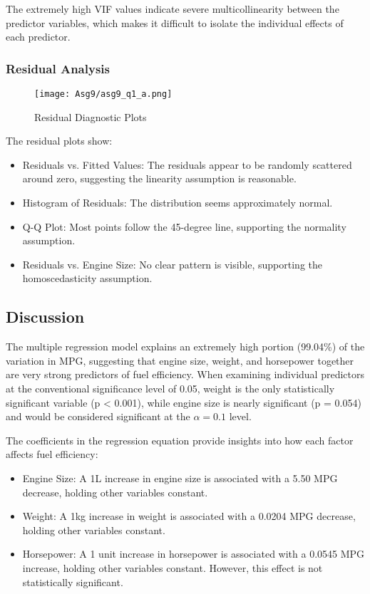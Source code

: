 \documentclass[12pt]{article}
\begin{document}
The extremely high VIF values indicate severe multicollinearity between the predictor variables, which makes it difficult to isolate the individual effects of each predictor.

\subsubsection{Residual Analysis}
\begin{figure}[H]
    \centering
    \texttt{[image: Asg9/asg9\_q1\_a.png]}
    \caption{Residual Diagnostic Plots}
    \label{fig:enter-label}
\end{figure}
The residual plots show:
\begin{itemize}
    \item Residuals vs. Fitted Values: The residuals appear to be randomly scattered around zero, suggesting the linearity assumption is reasonable.
    \item Histogram of Residuals: The distribution seems approximately normal.
    \item Q-Q Plot: Most points follow the 45-degree line, supporting the normality assumption.
    \item Residuals vs. Engine Size: No clear pattern is visible, supporting the homoscedasticity assumption.
\end{itemize}

\subsection{Discussion}
The multiple regression model explains an extremely high portion (99.04\%) of the variation in MPG, suggesting that engine size, weight, and horsepower together are very strong predictors of fuel efficiency. When examining individual predictors at the conventional significance level of 0.05, weight is the only statistically significant variable (p < 0.001), while engine size is nearly significant (p = 0.054) and would be considered significant at the $\alpha = 0.1$ level.

The coefficients in the regression equation provide insights into how each factor affects fuel efficiency:
\begin{itemize}
    \item Engine Size: A 1L increase in engine size is associated with a 5.50 MPG decrease, holding other variables constant.
    \item Weight: A 1kg increase in weight is associated with a 0.0204 MPG decrease, holding other variables constant.
    \item Horsepower: A 1 unit increase in horsepower is associated with a 0.0545 MPG increase, holding other variables constant. However, this effect is not statistically significant.
\end{itemize}
\end{document}
